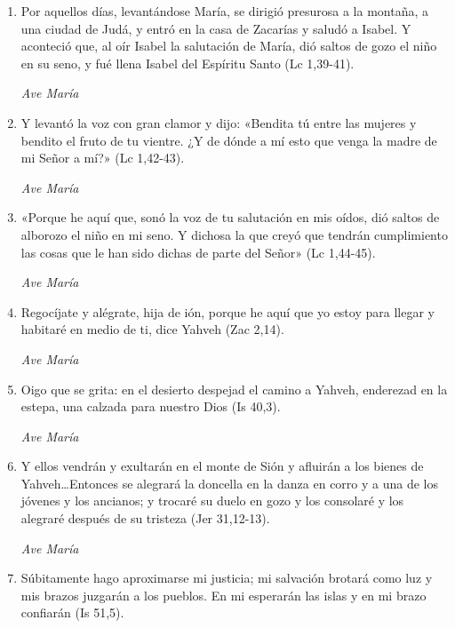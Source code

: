 \documentclass[a4paper,11pt, oneside]{report}
\begin{document}
        \begin{enumerate}
          
          \item Por aquellos días, levantándose María, se dirigió presurosa a la montaña, a una ciudad de Judá, y entró en la casa de Zacarías y saludó
          a Isabel. Y aconteció que, al oír Isabel la salutación de María, dió saltos de gozo el niño en su seno, y fué llena Isabel del Espíritu Santo 
          (Lc 1,39-41).
          
          \textit{Ave María}

          \item Y levantó la voz con gran clamor y dijo: «Bendita tú entre las mujeres y bendito el fruto de tu vientre. ¿Y de dónde a mí esto que venga
          la madre de mi Señor a mí?» (Lc 1,42-43).
          
          \textit{Ave María}

          \item «Porque he aquí que, sonó la voz de tu salutación en mis oídos, dió saltos de alborozo el niño en mi seno. Y dichosa la que creyó que 
          tendrán cumplimiento las cosas que le han sido dichas de parte del Señor» (Lc 1,44-45).
          
          \textit{Ave María}

          \item Regocíjate y alégrate, hija de ión, porque he aquí que yo estoy para llegar y habitaré en medio de ti, dice Yahveh (Zac 2,14).
          
          \textit{Ave María}

          \item Oigo que se grita: en el desierto despejad el camino a Yahveh, enderezad en la estepa, una calzada para nuestro Dios (Is 40,3).

          \textit{Ave María}

          \item Y ellos vendrán y exultarán en el monte de Sión y afluirán a los bienes de Yahveh\ldots Entonces se alegrará la doncella
          en la danza en corro y a una de los jóvenes y los ancianos; y trocaré su duelo en gozo y los consolaré y los alegraré después de su tristeza
          (Jer 31,12-13).
          
          \textit{Ave María}

          \item Súbitamente hago aproximarse mi justicia; mi salvación brotará como luz y mis brazos juzgarán a los pueblos. En mi esperarán las islas
          y en mi brazo confiarán (Is 51,5).
          

\end{enumerate}
\end{document}
